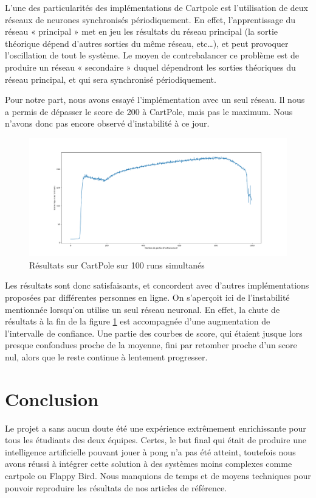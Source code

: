 \documentclass[
    10pt,
    a4paper,
    oneside,
    headinclude,footinclude,
    BCOR=5mm,
    captions=tableabove
]{scrartcl}
\begin{document}
L’une des particularités des implémentations de Cartpole est l’utilisation de deux réseaux de neurones synchronisés périodiquement. En effet, l’apprentissage du réseau « principal » met en jeu les résultats du réseau principal (la sortie théorique dépend d’autres sorties du même réseau, etc…), et peut provoquer l’oscillation de tout le système. Le moyen de contrebalancer ce problème est de produire un réseau « secondaire » duquel dépendront les sorties théoriques du réseau principal, et qui sera synchronisé périodiquement.

Pour notre part, nous avons essayé l'implémentation avec un seul réseau. Il nous a permis de dépasser le score de 200 à CartPole, mais pas le maximum. Nous n'avons donc pas encore observé d'instabilité à ce jour.

\begin{figure}
\includegraphics[width=\linewidth]{cartpole_1.png}
\centering
\caption{Résultats sur CartPole sur 100 runs simultanés}
\label{fig:cartpole_1}
\end{figure}

Les résultats sont donc satisfaisants, et concordent avec d'autres implémentations proposées par différentes personnes en ligne. On s'aperçoit ici de l'instabilité mentionnée lorsqu'on utilise un seul réseau neuronal.
En effet, la chute de résultats à la fin de la figure \ref{fig:cartpole_1} est accompagnée d'une augmentation de l'intervalle de confiance.
Une partie des courbes de score, qui étaient jusque lors presque confondues proche de la moyenne, fini par retomber proche d'un score nul, alors que le reste continue à lentement progresser.

\newpage
\section*{Conclusion}
Le projet a sans aucun doute été une expérience extrêmement enrichissante pour tous les étudiants des deux équipes. Certes, le but final qui était de produire une intelligence artificielle pouvant jouer à pong n’a pas été atteint, toutefois nous avons réussi à intégrer cette solution à des systèmes moins complexes comme cartpole ou Flappy Bird. Nous manquions de temps et de moyens techniques pour pouvoir reproduire les résultats de nos articles de référence.
\end{document}
